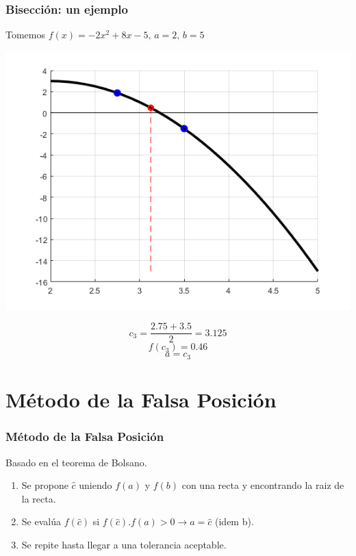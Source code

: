 \documentclass[xcolor=svgnames]{beamer} %
\theoremstyle{plain}
\theoremstyle{definition}
\begin{document}
\begin{frame}
\frametitle{Bisección: un ejemplo}
Tomemos $f(x) = -2x^2+8x-5, \, a=2, \, b=5$
\begin{minipage}{.7\linewidth}
\includegraphics[scale=.5]{Biseccion/f5.png} 
\end{minipage}
\begin{minipage}{.25\linewidth}
$$c_3 = \frac{2.75+3.5}{2} = 3.125 $$\vspace{7pt}
$$f(c_3) = 0.46 $$\vspace{7pt}
$$ a = c_3$$
\end{minipage}
\end{frame}



\section{Método de la Falsa Posición}

\begin{frame}
\frametitle{Método de la Falsa Posición}

Basado en el teorema de Bolsano.\vspace{12pt}


\begin{enumerate}
  \item Se propone $\hat c$ uniendo $f(a)$ y $f(b)$ con una recta y encontrando la raiz de la recta.
  \item Se evalúa $f(\hat c)$ si $f(\hat c).f(a)>0 \rightarrow  a=\hat c$ (idem b). 
  \item  Se repite hasta llegar a una tolerancia aceptable.
\end{enumerate}

\end{frame}
\end{document}
